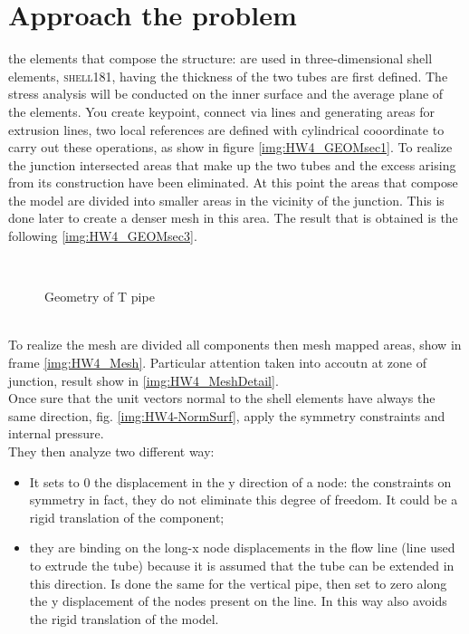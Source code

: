 \section{Approach the problem}
the elements that compose the structure: are used in three-dimensional shell elements, \textsc{shell181}, having the thickness of the two tubes are first defined. The stress analysis will be conducted on the inner surface and the average plane of the elements.
You create keypoint, connect via lines and generating areas for extrusion lines, 
two local references are defined with cylindrical cooordinate to carry out these operations, as show in figure \ref{img:HW4_GEOMsec1}.
To realize the junction intersected areas that make up the two tubes and the excess arising from its construction have been eliminated. At this point the areas that compose the model are divided into smaller areas in the vicinity of the junction. This is done later to create a denser mesh in this area.
The result that is obtained is the following \ref{img:HW4_GEOMsec3}.
\begin{figure}[!h]
\centering
{}\,
\caption{Geometry of T pipe}
\label{img:HW4-GeomSection}
\end{figure}
\pagebreak\\
To realize the mesh are divided all components then mesh mapped areas, show in frame \ref{img:HW4_Mesh}. Particular attention taken into accoutn at zone of junction, result show in \ref{img:HW4_MeshDetail}.\\
Once sure that the unit vectors normal to the shell elements have always the same direction, fig. \ref{img:HW4-NormSurf}, apply the symmetry constraints and internal pressure. \\They then analyze two different way:
\begin{itemize}
\item It sets to 0 the displacement in the y direction of a node: the constraints on symmetry in fact, they do not eliminate this degree of freedom. It could be a rigid translation of the component;
\item they are binding on the long-x node displacements in the flow line (line used to extrude the tube) because it is assumed that the tube can be extended in this direction. Is done the same for the vertical pipe, then set to zero along the y displacement of the nodes present on the line. In this way also avoids the rigid translation of the model.
\end{itemize}
